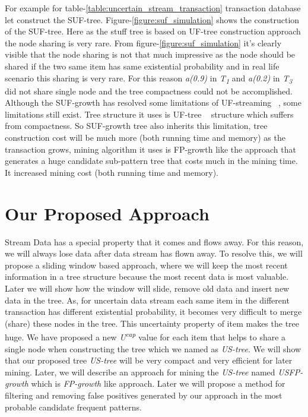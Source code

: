 \documentclass[conference]{IEEEtran}
\begin{document}
    For example for table-\ref{table:uncertain_stream_transaction} transaction database let construct the SUF-tree. Figure-\ref{figure:suf_simulation} shows the construction of the SUF-tree. Here as the stuff tree is based on UF-tree construction approach the node sharing is very rare. From figure-\ref{figure:suf_simulation} it’s clearly visible that the node sharing is not that much impressive as the node should be shared if the two same item has same existential probability and in real life scenario this sharing is very rare. For this reason \emph{a(0.9)} in \emph{T\textsubscript{1}} and \emph{a(0.2)} in \emph{T\textsubscript{3}} did not share single node and the tree compactness could not be accomplished. Although the SUF-growth has resolved some limitations of UF-streaming ~\cite{suf_growth}, some limitations still exist. Tree structure it uses is UF-tree ~\cite{uf_growth} structure which suffers from compactness. So SUF-growth tree also inherits this limitation, tree construction cost will be much more (both running time and memory) as the transaction grows, mining algorithm it uses is FP-growth like the approach that generates a huge candidate sub-pattern tree that costs much in the mining time. It increased mining cost (both running time and memory).
\section{Our Proposed Approach}
Stream Data has a special property that it comes and flows away. For this reason, we will always lose data after data stream has flown away. To resolve this, we will propose a sliding window based approach, where we will keep the most recent information in a tree structure because the most recent data is most valuable. Later we will show how the window will slide, remove old data and insert new data in the tree. As, for uncertain data stream each same item in the different transaction has different existential probability, it becomes very difficult to merge (share) these nodes in the tree. This uncertainty property of item makes the tree huge. We have proposed a new \emph{U\textsuperscript{cap}} value for each item that helps to share a single node when constructing the tree which we named as \emph{US-tree}. We will show that our proposed tree \emph{US-tree} will be very compact and very efficient for later mining. Later, we will describe an approach for mining the \emph {US-tree} named \emph{USFP-growth} which is \emph{FP-growth} like approach. Later we will propose a method for filtering and removing false positives generated by our approach in the most probable candidate frequent patterns.
\end{document}
